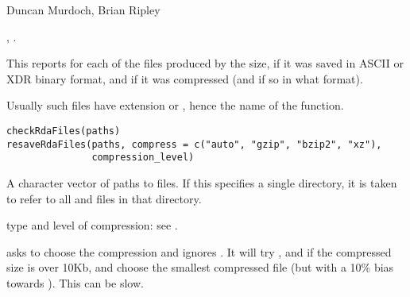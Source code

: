 %
\begin{Author}\relax
Duncan Murdoch, Brian Ripley
\end{Author}
%
\begin{SeeAlso}\relax
{}, .
\end{SeeAlso}
%
\begin{Description}\relax
This reports for each of the files produced by  the size,
if it was saved in ASCII or XDR binary format, and if it was
compressed (and if so in what format).

Usually such files have extension  or , hence
the name of the function. 
\end{Description}
%
\begin{Usage}
\begin{verbatim}
checkRdaFiles(paths)
resaveRdaFiles(paths, compress = c("auto", "gzip", "bzip2", "xz"),
               compression_level)
\end{verbatim}
\end{Usage}
%
\begin{Arguments}
\begin{ldescription}
\item[\code{paths}] A character vector of paths to  files.  If
this specifies a single directory, it is taken to refer to all
 and  files in that directory.

\item[\code{compress, compression\_level}] type and level of compression: see
.
\end{ldescription}
\end{Arguments}
%
\begin{Details}\relax
{} asks \R{} to choose the compression and ignores
.  It will try , 
and if the  compressed size is over 10Kb,  and
choose the smallest compressed file (but with a 10\% bias towards
).  This can be slow.
\end{Details}
%
